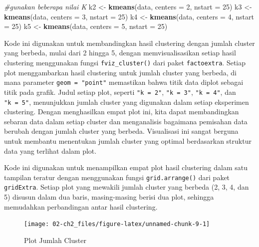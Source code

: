 \documentclass[
  oneside]{book}
\newenvironment{Shaded}{\begin{snugshade}}{\end{snugshade}}
\newcommand{\AttributeTok}[1]{\textcolor[rgb]{0.13,0.29,0.53}{#1}}
\newcommand{\CommentTok}[1]{\textcolor[rgb]{0.56,0.35,0.01}{\textit{#1}}}
\newcommand{\DecValTok}[1]{\textcolor[rgb]{0.00,0.00,0.81}{#1}}
\newcommand{\FunctionTok}[1]{\textcolor[rgb]{0.13,0.29,0.53}{\textbf{#1}}}
\newcommand{\NormalTok}[1]{#1}
\newcommand{\OtherTok}[1]{\textcolor[rgb]{0.56,0.35,0.01}{#1}}
\begin{document}
\begin{Shaded}
\begin{Highlighting}[]
\CommentTok{\#gunakan beberapa nilai K}
\NormalTok{k2 }\OtherTok{\textless{}{-}} \FunctionTok{kmeans}\NormalTok{(data, }\AttributeTok{centers =} \DecValTok{2}\NormalTok{, }\AttributeTok{nstart =} \DecValTok{25}\NormalTok{)}
\NormalTok{k3 }\OtherTok{\textless{}{-}} \FunctionTok{kmeans}\NormalTok{(data, }\AttributeTok{centers =} \DecValTok{3}\NormalTok{, }\AttributeTok{nstart =} \DecValTok{25}\NormalTok{)}
\NormalTok{k4 }\OtherTok{\textless{}{-}} \FunctionTok{kmeans}\NormalTok{(data, }\AttributeTok{centers =} \DecValTok{4}\NormalTok{, }\AttributeTok{nstart =} \DecValTok{25}\NormalTok{)}
\NormalTok{k5 }\OtherTok{\textless{}{-}} \FunctionTok{kmeans}\NormalTok{(data, }\AttributeTok{centers =} \DecValTok{5}\NormalTok{, }\AttributeTok{nstart =} \DecValTok{25}\NormalTok{)}
\end{Highlighting}
\end{Shaded}

Kode ini digunakan untuk membandingkan hasil clustering dengan jumlah cluster yang berbeda, mulai dari 2 hingga 5, dengan memvisualisasikan setiap hasil clustering menggunakan fungsi \texttt{fviz\_cluster()} dari paket \texttt{factoextra}. Setiap plot menggambarkan hasil clustering untuk jumlah cluster yang berbeda, di mana parameter \texttt{geom\ =\ "point"} memastikan bahwa titik data diplot sebagai titik pada grafik. Judul setiap plot, seperti \texttt{"k\ =\ 2"}, \texttt{"k\ =\ 3"}, \texttt{"k\ =\ 4"}, dan \texttt{"k\ =\ 5"}, menunjukkan jumlah cluster yang digunakan dalam setiap eksperimen clustering. Dengan menghasilkan empat plot ini, kita dapat membandingkan sebaran data dalam setiap cluster dan menganalisis bagaimana pemisahan data berubah dengan jumlah cluster yang berbeda. Visualisasi ini sangat berguna untuk membantu menentukan jumlah cluster yang optimal berdasarkan struktur data yang terlihat dalam plot.

Kode ini digunakan untuk menampilkan empat plot hasil clustering dalam satu tampilan teratur dengan menggunakan fungsi \texttt{grid.arrange()} dari paket \texttt{gridExtra}. Setiap plot yang mewakili jumlah cluster yang berbeda (2, 3, 4, dan 5) disusun dalam dua baris, masing-masing berisi dua plot, sehingga memudahkan perbandingan antar hasil clustering.

\begin{figure}[h]

{\centering \texttt{[image: 02-ch2\_files/figure-latex/unnamed-chunk-9-1]} 

}

\caption{Plot Jumlah Cluster}\label{fig:unnamed-chunk-9}
\end{figure}
\end{document}
